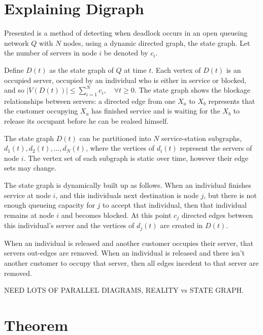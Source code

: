\documentclass{article}
\begin{document}
\section{Explaining Digraph}

Presented is a method of detecting when deadlock occurs in an open queueing network $Q$ with $N$ nodes, using a dynamic directed graph, the state graph.
Let the number of servers in node $i$ be denoted by $c_i$.\newline

Define $D(t)$ as the state graph of $Q$ at time $t$.
Each vertex of $D(t)$ is an occupied server, occupied by an individual who is either in service or blocked, and so $\left| V\left(D\left(t\right)\right) \right| \leq \sum_{i=1}^N c_i, \quad \forall t \geq 0$.
The state graph shows the blockage relationships between servers: a directed edge from one $X_a$ to $X_b$ represents that the customer occupying $X_a$ has finished service and is waiting for the $X_b$ to release its occupant before he can be realsed himself.\newline

The state graph $D(t)$ can be partitioned into $N$ service-station subgraphs, $d_1(t), d_2(t), ..., d_N(t)$, where the vertices of $d_i(t)$ represent the servers of node $i$.
The vertex set of each subgraph is static over time, however their edge sets may change.\newline

The state graph is dynamically built up as follows.
When an individual finishes service at node $i$, and this individuals next destination is node $j$, but there is not enough queueing capacity for $j$ to accept that individual, then that individual remains at node $i$ and becomes blocked.
At this point $c_j$ directed edges between this individual's server and the vertices of $d_j(t)$ are created in $D(t)$.\newline

When an individual is released and another customer occupies their server, that servers out-edges are removed.
When an individual is released and there isn't another customer to occupy that server, then all edges incedent to that server are removed.\newline

NEED LOTS OF PARALLEL DIAGRAMS, REALITY vs STATE GRAPH.



\section{Theorem}
\end{document}
